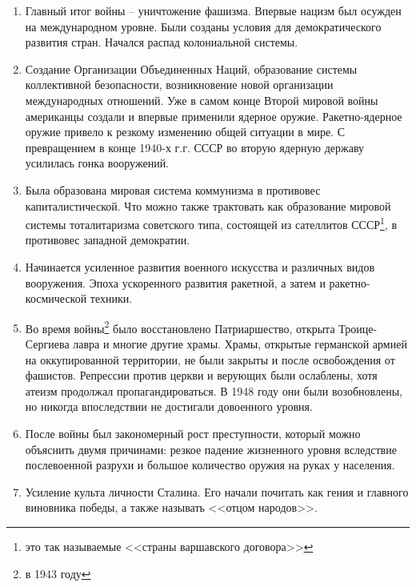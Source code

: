 \documentclass[12pt]{article}
\begin{document}
  \begin{enumerate}
    \item Главный итог войны -- уничтожение фашизма.
    Впервые нацизм был осужден на международном уровне.
    Были созданы условия для демократического развития стран.
    Начался распад колониальной системы.
    \item Создание Организации Объединенных Наций, образование системы коллективной безопасности, возникновение новой организации международных отношений.
    Уже в самом конце Второй мировой войны американцы создали и впервые применили ядерное оружие.
    Ракетно-ядерное оружие привело к резкому изменению общей ситуации в мире.
    С превращением в конце 1940-х г.г. СССР во вторую ядерную державу усилилась гонка вооружений.
    \item Была образована мировая система коммунизма в противовес капиталистической.
    Что можно также трактовать как образование мировой системы тоталитаризма советского типа,
    состоящей из сателлитов СССР\footnote{это так называемые <<страны варшавского договора>>},
    в противовес западной демократии.
    \item Начинается усиленное развития военного искусства и различных видов вооружения.
    Эпоха ускоренного развития ракетной, а затем и ракетно-космической техники.
    \item Во время войны\footnote{в 1943 году} было восстановлено Патриаршество, открыта Троице-Сергиева лавра и многие другие храмы.
    Храмы, открытые германской армией на оккупированной территории, не были закрыты и после освобождения от фашистов.
    Репрессии против церкви и верующих были ослаблены, хотя атеизм продолжал пропагандироваться.
    В 1948 году они были возобновлены, но никогда впоследствии не достигали довоенного уровня.
    \item После войны был закономерный рост преступности, который можно объяснить двумя причинами:
    резкое падение жизненного уровня вследствие послевоенной разрухи и большое количество оружия на руках у населения.
    \item Усиление культа личности Сталина.
    Его начали почитать как гения и главного виновника победы, а также называть <<отцом народов>>.
  \end{enumerate}

\end{document}
